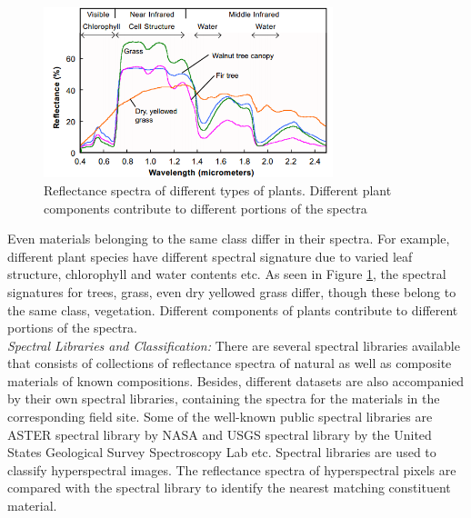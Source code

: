 \documentclass[12pt,twoside]{article}
\theoremstyle{plain}
\theoremstyle{definition}
\theoremstyle{remark}
\newcommand{\forceindent}{\leavevmode{\parindent=2em\indent}}
\begin{document}
\begin{figure}[hbtp]
\centering
\includegraphics[width=0.75\textwidth]{src/plant_spectra.png}
\caption{Reflectance spectra of different types of plants. Different plant components contribute to different portions of the spectra \cite{smith2012} }
\label{fig:plant_spec}
\end{figure}
Even materials belonging to the same class differ in their spectra. For example, different plant species have different spectral signature due to varied leaf structure, chlorophyll and water contents etc. As seen in Figure \ref{fig:plant_spec}, the spectral signatures for trees, grass, even dry yellowed grass differ, though these belong to the same class, vegetation. Different components of plants contribute to different portions of the spectra.\\
\forceindent \textit{Spectral Libraries and Classification:} There are several spectral libraries available that consists of collections of reflectance spectra of natural as well as composite materials of known compositions. Besides, different datasets are also accompanied by their own spectral libraries, containing the spectra for the materials in the corresponding field site. Some of the well-known public spectral libraries are ASTER spectral library by NASA \cite{baldridge2009aster} and USGS spectral library by the United States Geological Survey Spectroscopy Lab \cite{clark1993us} etc. Spectral libraries are used to classify hyperspectral images. The reflectance spectra of hyperspectral pixels are compared with the spectral library to identify the nearest matching constituent material.\\
\end{document}
